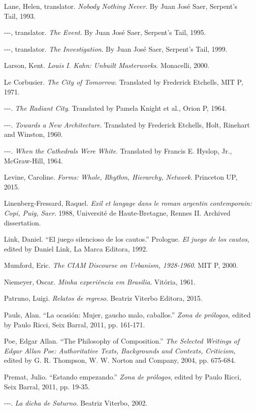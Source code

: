 \documentclass[11pt]{report}
\begin{document}
\begin{hangparas}{.25in}{1}
Lane, Helen, translator. \textit{Nobody Nothing Never}. By Juan José Saer, Serpent's Tail, 1993.

-{}-{}-, translator. \textit{The Event}. By Juan José Saer, Serpent's Tail, 1995.

-{}-{}-, translator. \textit{The Investigation}. By Juan José Saer, Serpent's Tail, 1999.

Larson, Kent. \textit{Louis I. Kahn: Unbuilt Masterworks}. Monacelli, 2000.

Le Corbusier. \textit{The City of Tomorrow}. Translated by Frederick Etchells, MIT P, 1971.

-{}-{}-. \textit{The Radiant City}. Translated by Pamela Knight et al., Orion P, 1964.

-{}-{}-. \textit{Towards a New Architecture}. Translated by Frederick Etchells, Holt, Rinehart and Winston, 1960.

-{}-{}-. \textit{When the Cathedrals Were White}. Translated by Francis E. Hyslop, Jr., McGraw-Hill, 1964.

Levine, Caroline. \textit{Forms: Whole, Rhythm, Hierarchy, Network}. Princeton UP, 2015.

Linenberg-Fressard, Raquel. \textit{Exil et langage dans le roman argentin contemporain: Copi, Puig, Saer}. 1988, Université de Haute-Bretagne, Rennes II. Archived dissertation.

Link, Daniel. ``El juego silencioso de los cautos.'' Prologue. \textit{El juego de los cautos}, edited by Daniel Link, La Marca Editora, 1992.

Mumford, Eric. \textit{The CIAM Discourse on Urbanism, 1928-1960}. MIT P, 2000.

Niemeyer, Oscar. \textit{Minha experiência em Brasilia}. Vitória, 1961.

Patruno, Luigi. \textit{Relatos de regreso}. Beatriz Viterbo Editora, 2015.

Pauls, Alan. ``La ocasión: Mujer, gaucho malo, caballos.'' \textit{Zona de prólogos}, edited by Paulo Ricci, Seix Barral, 2011, pp. 161-171.

Poe, Edgar Allan. ``The Philosophy of Composition.'' \textit{The Selected Writings of Edgar Allan Poe: Authoritative Texts, Backgrounds and Contexts, Criticism}, edited by G. R. Thompson, W. W. Norton and Company, 2004, pp. 675-684.

Premat, Julio. ``Estando empezando.'' \textit{Zona de prólogos}, edited by Paulo Ricci, Seix Barral, 2011, pp. 19-35.

-{}-{}-. \textit{La dicha de Saturno}. Beatriz Viterbo, 2002.


\end{hangparas}
\end{document}
